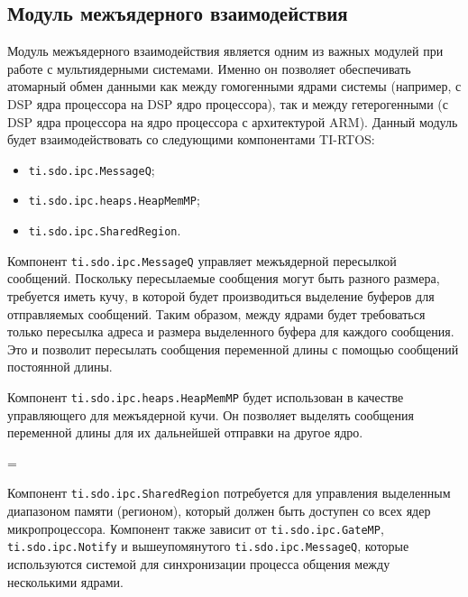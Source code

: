 
\subsection{Модуль межъядерного взаимодействия}

Модуль межъядерного взаимодействия является одним из важных модулей при работе
с мультиядерными системами. Именно он позволяет обеспечивать атомарный
обмен данными как между гомогенными ядрами системы (например, с DSP ядра
процессора на DSP ядро процессора), так и между гетерогенными (с DSP ядра
процессора на ядро процессора с архитектурой ARM). Данный модуль будет
взаимодействовать со следующими компонентами TI-RTOS:
\begin{itemize}
    \item \texttt{ti.sdo.ipc.MessageQ};
    \item \texttt{ti.sdo.ipc.heaps.HeapMemMP};
    \item \texttt{ti.sdo.ipc.SharedRegion}.
\end{itemize}

Компонент \texttt{ti.sdo.ipc.MessageQ} управляет межъядерной пересылкой сообщений.
Поскольку пересылаемые сообщения могут быть разного размера, требуется иметь
кучу, в которой будет производиться выделение буферов для отправляемых сообщений.
Таким образом, между ядрами будет требоваться только пересылка адреса и размера
выделенного буфера для каждого сообщения. Это и позволит пересылать сообщения
переменной длины с помощью сообщений постоянной длины.

Компонент \texttt{ti.sdo.ipc.heaps.HeapMemMP} будет использован в качестве
управляющего для межъядерной кучи. Он позволяет выделять сообщения переменной длины
для их дальнейшей отправки на другое ядро.

\newdimen\origiwstr
\origiwstr=\font
{}\origiwstr

Компонент \texttt{ti.sdo.ipc.SharedRegion} потребуется для управления выделенным
диапазоном памяти (регионом), который должен быть доступен со всех ядер
микропроцессора. Компонент также зависит от \texttt{ti.sdo.ipc.GateMP},
\texttt{ti.sdo.ipc.Notify} и вышеупомянутого \texttt{ti.sdo.ipc.MessageQ},
которые используются системой для синхронизации процесса общения между
несколькими ядрами.

